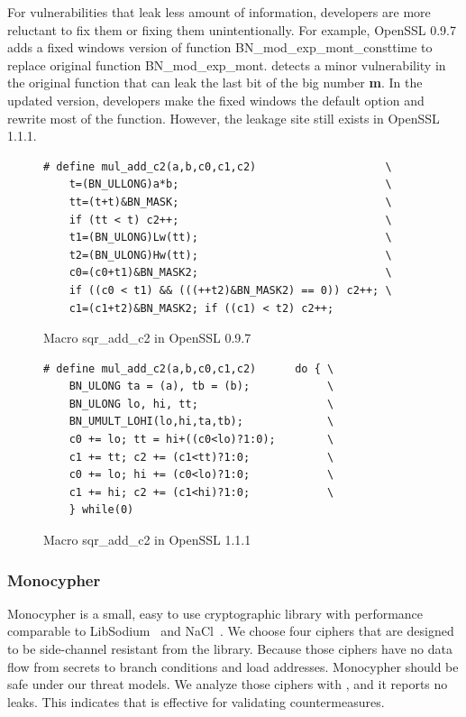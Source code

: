 For vulnerabilities that leak less amount of information,
developers are more reluctant to fix them or fixing them unintentionally. For example, OpenSSL 0.9.7 adds a fixed windows version of function \textsf{BN\_mod\_exp\_mont\_consttime} to replace original function \textsf{BN\_mod\_exp\_mont}.
\tool{} detects a minor vulnerability in the original function that can leak the last bit of the big number \textbf{m}. In the updated version, developers make the fixed windows the default option and rewrite most of the function. However, the leakage site still exists in OpenSSL 1.1.1.
\begin{figure}
    \centering
    \begin{lstlisting}[xleftmargin=.02\textwidth,xrightmargin=.01\textwidth]
# define mul_add_c2(a,b,c0,c1,c2)                    \
    t=(BN_ULLONG)a*b;                                \
    tt=(t+t)&BN_MASK;                                \
    if (tt < t) c2++;                                \
    t1=(BN_ULONG)Lw(tt);                             \
    t2=(BN_ULONG)Hw(tt);                             \
    c0=(c0+t1)&BN_MASK2;                             \
    if ((c0 < t1) && (((++t2)&BN_MASK2) == 0)) c2++; \
    c1=(c1+t2)&BN_MASK2; if ((c1) < t2) c2++;
\end{lstlisting}
    \vspace*{-6pt}
    \caption{Macro \textsf{sqr\_add\_c2} in OpenSSL 0.9.7}
    \label{fig:old_sqr2}
    \vspace*{-8pt}
\end{figure}


\begin{figure}
    \centering
    \begin{lstlisting}[xleftmargin=.02\textwidth,xrightmargin=.01\textwidth]
# define mul_add_c2(a,b,c0,c1,c2)      do { \
    BN_ULONG ta = (a), tb = (b);            \
    BN_ULONG lo, hi, tt;                    \
    BN_UMULT_LOHI(lo,hi,ta,tb);             \
    c0 += lo; tt = hi+((c0<lo)?1:0);        \
    c1 += tt; c2 += (c1<tt)?1:0;            \
    c0 += lo; hi += (c0<lo)?1:0;            \
    c1 += hi; c2 += (c1<hi)?1:0;            \
    } while(0)
\end{lstlisting}
\caption{Macro \textsf{sqr\_add\_c2} in OpenSSL 1.1.1}
\label{fig:new_sqr2}
\end{figure}


\subsubsection{Monocypher}\label{eval:mono}
Monocypher is a small, easy to use cryptographic library with
performance comparable to LibSodium~\cite{libsodium} and NaCl~\cite{bernstein2012security}.
We choose four ciphers that are
designed to be side-channel resistant from the library.
Because those ciphers have no
data flow from secrets to branch conditions and load addresses.
Monocypher should be safe under our threat models.
We analyze those ciphers with \tool{}, and it reports no leaks.
This indicates that \tool{} is effective for validating countermeasures.

